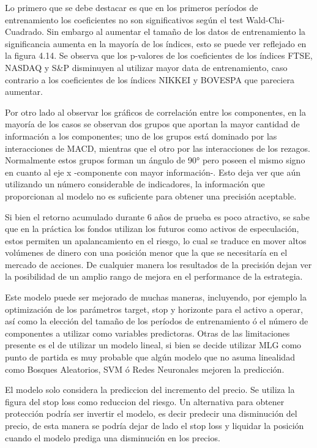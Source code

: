 \documentclass[a4paper,12pt]{Latex/Classes/PhDthesisPSnPDF}
\begin{document}
Lo primero que se debe destacar es que en los primeros períodos de entrenamiento los coeficientes no son significativos según el test Wald-Chi-Cuadrado. Sin embargo al aumentar el tamaño de los datos de entrenamiento la significancia aumenta en la mayoría de los índices, esto se puede ver reflejado en la figura 4.14. Se observa que los p-valores de los coeficientes de los índices FTSE, NASDAQ y S\&P disminuyen al utilizar mayor data de entrenamiento, caso contrario a los coeficientes de los índices NIKKEI y BOVESPA que pareciera aumentar.

Por otro lado al observar los gráficos de correlación entre los componentes, en la mayoría de los casos se observan dos grupos que aportan la mayor cantidad de información a los componentes; uno de los grupos está dominado por las interacciones de MACD, mientras que el otro por las interacciones de los rezagos. Normalmente estos grupos forman un ángulo de 90° pero poseen el mismo signo en cuanto al eje x -componente con mayor información-. Esto deja ver que aún utilizando un número considerable de indicadores, la información que proporcionan al modelo no es suficiente para obtener una precisión aceptable. 

Si bien el retorno acumulado durante 6 años de prueba es poco atractivo, se sabe que en la práctica los fondos utilizan los futuros como activos de especulación, estos permiten un apalancamiento en el riesgo, lo cual se traduce en mover altos volúmenes de dinero con una posición menor que la que se necesitaría en el mercado de acciones. De cualquier manera los resultados de la precisión dejan ver la posibilidad de un amplio rango de mejora en el performance de la estrategia. 

Este modelo puede ser mejorado de muchas maneras, incluyendo, por ejemplo la optimización de los parámetros target, stop y horizonte para el activo a operar, así como la elección del tamaño de los períodos de entrenamiento ó el número de componentes a utilizar como variables predictoras. Otras de las limitaciones presente es el de utilizar un modelo lineal, si bien se decide utilizar MLG como punto de partida es muy probable que algún modelo que no asuma linealidad como Bosques Aleatorios, SVM ó Redes Neuronales mejoren la predicción. 

El modelo solo considera la prediccion del incremento del precio. Se utiliza la figura del stop loss como reduccion del riesgo. Un alternativa para obtener protección podría ser invertir el modelo, es decir predecir una disminución del precio, de esta manera se podría dejar de lado el stop loss y liquidar la posición cuando el modelo prediga una disminución en los precios.
\end{document}
